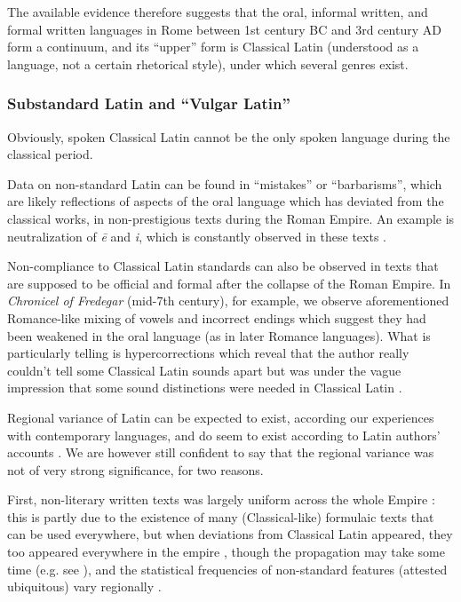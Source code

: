 \documentclass[a4paper, oneside, 12pt]{report}
\newcommand*{\citepage}[1]{p.~{#1}}
\newcommand*{\citepages}[1]{pp.~{#1}}
\newcommand{\form}[1]{\emph{#1}}
\newcommand{\literature}[1]{\textit{#1}}
\begin{document}
The available evidence therefore suggests that the oral, informal written, and formal written languages in Rome
between 1st century BC and 3rd century AD form a continuum,
and its ``upper'' form is Classical Latin (understood as a language, not a certain rhetorical style), under which several genres exist.

\subsubsection{Substandard Latin and ``Vulgar Latin''}\label{sec:introduction.history.vulgar}

Obviously, spoken Classical Latin cannot be the only spoken language during the classical period.

Data on non-standard Latin can be found in ``mistakes'' or ``barbarisms'', 
which are likely reflections of aspects of the oral language 
which has deviated from the classical works, 
in non-prestigious texts during the Roman Empire.
An example is neutralization of \form{\={e}} and \form{i}, which is constantly observed in these texts
\citep[\citepage{4}]{herman2010vulgar}.

Non-compliance to Classical Latin standards can also be observed in texts
that are supposed to be official and formal
after the collapse of the Roman Empire.
In \literature{Chronicel of Fredegar} (mid-7th century), for example, we observe
aforementioned Romance-like mixing of vowels
and incorrect endings which suggest they had been weakened in the oral language
(as in later Romance languages).
What is particularly telling is hypercorrections
which reveal that the author really couldn't tell some Classical Latin sounds apart
but was under the vague impression that
some sound distinctions were needed in Classical Latin
\citep[\citepages{158-159}]{leonhardt2013latin}.

Regional variance of Latin can be expected to exist,
according our experiences with contemporary languages,
and do seem to exist according to Latin authors' accounts
\citep[\citepage{116}]{herman2010vulgar}.
We are however still confident to say that the regional variance 
was not of very strong significance, for two reasons.

First, non-literary written texts was largely uniform across the whole Empire
\citep[\citepage{117}]{herman2010vulgar}:
this is partly due to the existence of 
many (Classical-like) formulaic texts that can be used everywhere,
but when deviations from Classical Latin appeared,
they too appeared everywhere in the empire
\citep[\citepage{235}]{clackson2011blackwell},
though the propagation may take some time
(e.g. see ),
and the statistical frequencies of non-standard features (attested ubiquitous) vary regionally
\citep[\citepage{118}]{herman2010vulgar}.
\end{document}
